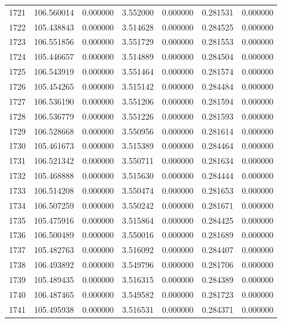 \begin{tabular}{rrrrrrr}
1721 & 106.560014 &    0.000000 &  3.552000 &    0.000000 &    0.281531 &  0.000000 \\
1722 & 105.438843 &    0.000000 &  3.514628 &    0.000000 &    0.284525 &  0.000000 \\
1723 & 106.551856 &    0.000000 &  3.551729 &    0.000000 &    0.281553 &  0.000000 \\
1724 & 105.446657 &    0.000000 &  3.514889 &    0.000000 &    0.284504 &  0.000000 \\
1725 & 106.543919 &    0.000000 &  3.551464 &    0.000000 &    0.281574 &  0.000000 \\
1726 & 105.454265 &    0.000000 &  3.515142 &    0.000000 &    0.284484 &  0.000000 \\
1727 & 106.536190 &    0.000000 &  3.551206 &    0.000000 &    0.281594 &  0.000000 \\
1728 & 106.536779 &    0.000000 &  3.551226 &    0.000000 &    0.281593 &  0.000000 \\
1729 & 106.528668 &    0.000000 &  3.550956 &    0.000000 &    0.281614 &  0.000000 \\
1730 & 105.461673 &    0.000000 &  3.515389 &    0.000000 &    0.284464 &  0.000000 \\
1731 & 106.521342 &    0.000000 &  3.550711 &    0.000000 &    0.281634 &  0.000000 \\
1732 & 105.468888 &    0.000000 &  3.515630 &    0.000000 &    0.284444 &  0.000000 \\
1733 & 106.514208 &    0.000000 &  3.550474 &    0.000000 &    0.281653 &  0.000000 \\
1734 & 106.507259 &    0.000000 &  3.550242 &    0.000000 &    0.281671 &  0.000000 \\
1735 & 105.475916 &    0.000000 &  3.515864 &    0.000000 &    0.284425 &  0.000000 \\
1736 & 106.500489 &    0.000000 &  3.550016 &    0.000000 &    0.281689 &  0.000000 \\
1737 & 105.482763 &    0.000000 &  3.516092 &    0.000000 &    0.284407 &  0.000000 \\
1738 & 106.493892 &    0.000000 &  3.549796 &    0.000000 &    0.281706 &  0.000000 \\
1739 & 105.489435 &    0.000000 &  3.516315 &    0.000000 &    0.284389 &  0.000000 \\
1740 & 106.487465 &    0.000000 &  3.549582 &    0.000000 &    0.281723 &  0.000000 \\
1741 & 105.495938 &    0.000000 &  3.516531 &    0.000000 &    0.284371 &  0.000000 \\

\end{tabular}
